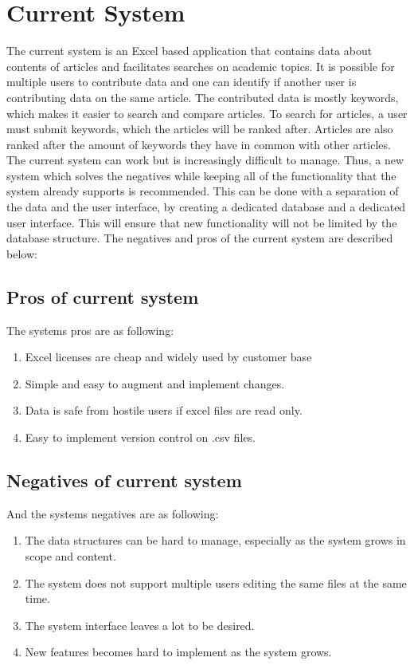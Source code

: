 \section{Current System}
The current system is an Excel based application that contains data about contents of articles and facilitates searches on academic topics. It is possible for multiple users to contribute data and one can identify if another user is contributing data on the same article. The contributed data is mostly keywords, which makes it easier to search and compare articles. To search for articles, a user must submit keywords, which the articles will be ranked after. Articles are also ranked after the amount of keywords they have in common with other articles. The current system can work but is increasingly difficult to manage. Thus, a new system which solves the negatives while keeping all of the functionality that the system already supports is recommended. This can be done with a separation of the data and the user interface, by creating a dedicated database and a dedicated user interface. This will ensure that new functionality will not be limited by the database structure. The negatives and pros of the current system are described below:

\subsection{Pros of current system}
The systems pros are as following:

\begin{enumerate}
	\item Excel licenses are cheap and widely used by customer base
	\item Simple and easy to augment and implement changes.
	\item Data is safe from hostile users if excel files are read only. 
	\item Easy to implement version control on .csv files. 
\end{enumerate}

\subsection{Negatives of current system} 
And the systems negatives are as following: 

\begin{enumerate}
	\item The data structures can be hard to manage, especially as the system grows in scope and content.
	\item The system does not support multiple users editing the same files at the same time.
	\item The system interface leaves a lot to be desired.
	\item New features becomes hard to implement as the system grows.
\end{enumerate}
